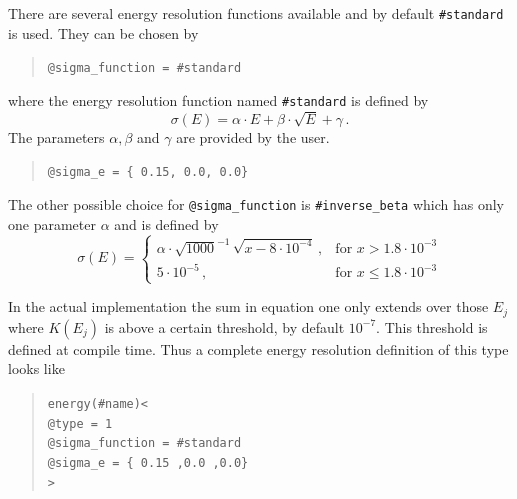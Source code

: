 There are several energy resolution functions available and by default
{\tt \#standard} is used. They can be chosen
by
\begin{quote}
{\tt \tb @sigma\_function = \#standard}
\end{quote}
where the energy resolution function named {\tt \#standard} is defined by
\begin{equation}
\label{eq:sigma_e}
\sigma(E)=\alpha\cdot E + \beta \cdot \sqrt{E} +\gamma\,.
\end{equation}
The parameters $\alpha, \beta$ and $\gamma$ are provided by the user.
\begin{quote}
{\tt \tb @sigma\_e = \{ 0.15, 0.0, 0.0\}}
\end{quote}
The other possible choice for {\tt @sigma\_function} is {\tt \#inverse\_beta}
which has only one parameter $\alpha$ and is defined by
\begin{equation}
\sigma(E)= \left\{\begin{array}{cl}
 \alpha \cdot \sqrt{1000}^{-1}\,\sqrt{x-8\cdot10^{-4}}\,,&\mathrm{for}\,\, 
x>1.8\cdot10^{-3}\\
5\cdot10^{-5} \,,&\mathrm{for}\,\, x \leq 1.8\cdot10^{-3}
\end{array} \right.
\end{equation}


In the actual implementation 
the sum in equation one only extends over those $E_j$ where $K(E_j)$ 
is above a certain threshold, by default $10^{-7}$. This threshold is 
defined at compile time. Thus a complete energy resolution definition of this 
type looks like
\begin{quote}
{\tt energy(\#name)<\\
\tb @type = 1\\
\tb @sigma\_function = \#standard\\
\tb @sigma\_e = \{ 0.15 ,0.0 ,0.0\}\\
>
}
\end{quote}



